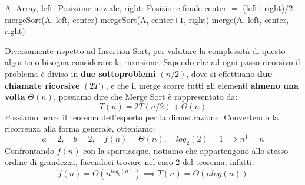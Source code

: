 \begin{algorithm}[H]
	\caption{mergeSort(A, left, right)}
	\begin{algorithmic}[1]
		\Require A: Array, left: Posizione iniziale, right: Posizione finale
		\State center $=$ (left$+$right)$/2$
		\State mergeSort(A, left, center) 
		\State mergeSort(A, center$+1$, right) 
		\State merge(A, left, center, right) 
		\EndIf
	\end{algorithmic}
\end{algorithm}
\noindent Diversamente rispetto ad Insertion Sort, per valutare la complessità di questo algoritmo bisogna considerare la ricorsione. Sapendo che ad ogni passo ricorsivo il problema è diviso in \textbf{due sottoproblemi} $(n/2)$, dove si effettuano \textbf{due chiamate ricorsive} $(2T)$, e che il merge scorre tutti gli elementi \textbf{almeno una volta} $\Theta(n)$, possiamo dire che Merge Sort è rappresentato da: \[T(n) = 2T(n/2) + \Theta(n)\]
\noindent Possiamo usare il teorema dell'esperto per la dimostrazione. Convertendo la ricorrenza alla forma generale, otteniamo: \[a=2,\quad b=2,\quad f(n) = \Theta(n),\quad log_2(2)=1\implies n^1=n\]
\noindent Confrontando $f(n)$ con la spartiacque, notiamo che appartengono allo stesso ordine di grandezza, facendoci trovare nel caso 2 del teorema, infatti: \[f(n) = \Theta\left(n^{log_b(a)}\right)\implies T(n) = \Theta(nlog(n))\]

%


